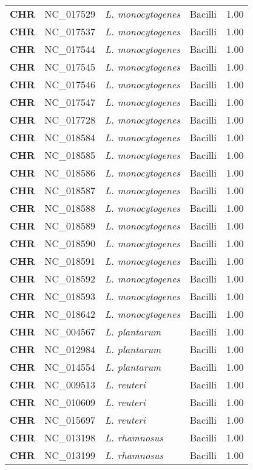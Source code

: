 \begin{adjustwidth}{-3cm}{2cm}
{\begin{supertabular}{>{\bfseries}l|p{0.1\textwidth}p{0.14\textwidth}l|l}
CHR & NC\_017529 & \textit{L. monocytogenes} & Bacilli & 1.00\\
CHR & NC\_017537 & \textit{L. monocytogenes} & Bacilli & 1.00\\
CHR & NC\_017544 & \textit{L. monocytogenes} & Bacilli & 1.00\\
CHR & NC\_017545 & \textit{L. monocytogenes} & Bacilli & 1.00\\
CHR & NC\_017546 & \textit{L. monocytogenes} & Bacilli & 1.00\\
CHR & NC\_017547 & \textit{L. monocytogenes} & Bacilli & 1.00\\
CHR & NC\_017728 & \textit{L. monocytogenes} & Bacilli & 1.00\\
CHR & NC\_018584 & \textit{L. monocytogenes} & Bacilli & 1.00\\
CHR & NC\_018585 & \textit{L. monocytogenes} & Bacilli & 1.00\\
CHR & NC\_018586 & \textit{L. monocytogenes} & Bacilli & 1.00\\
CHR & NC\_018587 & \textit{L. monocytogenes} & Bacilli & 1.00\\
CHR & NC\_018588 & \textit{L. monocytogenes} & Bacilli & 1.00\\
CHR & NC\_018589 & \textit{L. monocytogenes} & Bacilli & 1.00\\
CHR & NC\_018590 & \textit{L. monocytogenes} & Bacilli & 1.00\\
CHR & NC\_018591 & \textit{L. monocytogenes} & Bacilli & 1.00\\
CHR & NC\_018592 & \textit{L. monocytogenes} & Bacilli & 1.00\\
CHR & NC\_018593 & \textit{L. monocytogenes} & Bacilli & 1.00\\
CHR & NC\_018642 & \textit{L. monocytogenes} & Bacilli & 1.00\\
CHR & NC\_004567 & \textit{L. plantarum} & Bacilli & 1.00\\
CHR & NC\_012984 & \textit{L. plantarum} & Bacilli & 1.00\\
CHR & NC\_014554 & \textit{L. plantarum} & Bacilli & 1.00\\
CHR & NC\_009513 & \textit{L. reuteri} & Bacilli & 1.00\\
CHR & NC\_010609 & \textit{L. reuteri} & Bacilli & 1.00\\
CHR & NC\_015697 & \textit{L. reuteri} & Bacilli & 1.00\\
CHR & NC\_013198 & \textit{L. rhamnosus} & Bacilli & 1.00\\
CHR & NC\_013199 & \textit{L. rhamnosus} & Bacilli & 1.00\\

\end{supertabular}}
\end{adjustwidth}
